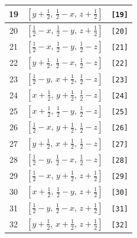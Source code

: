 \documentclass[fleqn,8pt]{jsarticle}
\begin{document}
\begin{longtable}{ccc}
19 & $\left[ y + \frac{1}{2},\, \frac{1}{2} - x,\, z + \frac{1}{2} \right]$ & {\tt [19]} \\ \hline
20 & $\left[ \frac{1}{2} - x,\, \frac{1}{2} - y,\, z + \frac{1}{2} \right]$ & {\tt [20]} \\ \hline
21 & $\left[ \frac{1}{2} - x,\, \frac{1}{2} - y,\, \frac{1}{2} - z \right]$ & {\tt [21]} \\ \hline
22 & $\left[ y + \frac{1}{2},\, \frac{1}{2} - x,\, \frac{1}{2} - z \right]$ & {\tt [22]} \\ \hline
23 & $\left[ \frac{1}{2} - y,\, x + \frac{1}{2},\, \frac{1}{2} - z \right]$ & {\tt [23]} \\ \hline
24 & $\left[ x + \frac{1}{2},\, y + \frac{1}{2},\, \frac{1}{2} - z \right]$ & {\tt [24]} \\ \hline
25 & $\left[ x + \frac{1}{2},\, \frac{1}{2} - y,\, \frac{1}{2} - z \right]$ & {\tt [25]} \\ \hline
26 & $\left[ \frac{1}{2} - x,\, y + \frac{1}{2},\, \frac{1}{2} - z \right]$ & {\tt [26]} \\ \hline
27 & $\left[ y + \frac{1}{2},\, x + \frac{1}{2},\, \frac{1}{2} - z \right]$ & {\tt [27]} \\ \hline
28 & $\left[ \frac{1}{2} - y,\, \frac{1}{2} - x,\, \frac{1}{2} - z \right]$ & {\tt [28]} \\ \hline
29 & $\left[ \frac{1}{2} - x,\, y + \frac{1}{2},\, z + \frac{1}{2} \right]$ & {\tt [29]} \\ \hline
30 & $\left[ x + \frac{1}{2},\, \frac{1}{2} - y,\, z + \frac{1}{2} \right]$ & {\tt [30]} \\ \hline
31 & $\left[ \frac{1}{2} - y,\, \frac{1}{2} - x,\, z + \frac{1}{2} \right]$ & {\tt [31]} \\ \hline
32 & $\left[ y + \frac{1}{2},\, x + \frac{1}{2},\, z + \frac{1}{2} \right]$ & {\tt [32]} \\
\end{longtable}
\end{document}
